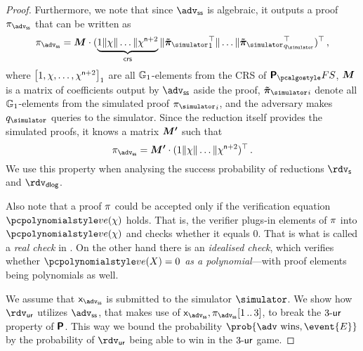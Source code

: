 \let\accentvec\vec \documentclass[runningheads,10pt]{llncs}
\def\vec#1{\mathchoice{\mbox{\boldmath$\displaystyle#1$}}
{\mbox{\boldmath$\textstyle#1$}} {\mbox{\boldmath$\scriptstyle#1$}}
{\mbox{\boldmath$\scriptscriptstyle#1$}}}
\begin{document}
\begin{proof}
	Furthermore, we note that since $\advss$ is algebraic, it outputs a proof $\zkproof_\advss$ that can be written as 
	\[
		\zkproof_\advss = \vec{M} \cdot (\underbrace{1 \| \chi \| \ldots \| \chi^{\numberofconstrains + 2}}_{\crs} \| \vec{\tilde{\zkproof}_\simulator}_1^{\top} \| \ldots \| \vec{\tilde{\zkproof}_\simulator}_{q_\simulator}^\top)^\top\,,
	\]
	where $\left[1, \chi, \ldots, \chi^{\mathsf{n} + 2}\right]_{1}$ are all $\mathbb{G}_1$-elements from the CRS of $\plonkprotfs$, $\vec{M}$ is a matrix of coefficients output by $\advss$ aside the proof, $\vec{\tilde{\zkproof}_\simulator}_i$ denote all $\mathbb{G}_1$-elements from the simulated proof ${\zkproof_\simulator}_i$, and the adversary makes $q_\simulator$ queries to the simulator. 
	Since the reduction itself provides the simulated proofs, it knows a matrix $\vec{M'}$ such that
	\begin{equation}
		\label{eq:M_prim}
		\zkproof_\advss = \vec{M'} \cdot (1 \| \chi \| \ldots \| \chi^{\numberofconstrains + 2})^\top\,.
	\end{equation}
	We use this property when analysing the success probability of reductions $\rdvs$ and $\rdvdlog$.

	Also note that a proof $\pi$ could be accepted only if the verification equation $\vereq(\chi)$ holds. That is, the verifier plugs-in elements of $\pi$ into $\vereq(\chi)$ and checks whether it equals $0$. That is what is called a \emph{real check} in \cite{EPRINT:GabWilCio19}. 
	On the other hand there is an \emph{idealised check}, which verifies whether $\vereq(X) = 0$ \emph{as a polynomial}---with proof elements being polynomials as well.

	We assume that $\inp_{\advss}$ is submitted to the simulator $\simulator$. 
	We show how $\rdvur$ utilizes $\advss$, that makes use of $\inp_\advss, \zkproof_{\advss}\range{1}{3}$, to break the ${3\text{-}\mathsf{ur}}$ property of $\bm{\mathsf{P}}$. 
	This way we bound the probability $\prob{\adv \text{ wins}, \event{E}}$ by the probability of $\rdvur$ being able to win in the ${3\text{-}\mathsf{ur}}$ game.


\end{proof}
\end{document}
